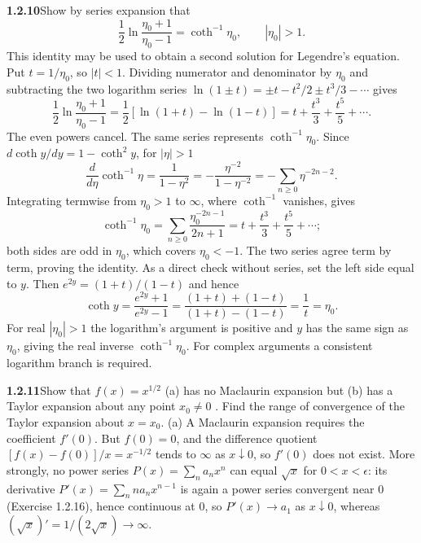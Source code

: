 \par\bigskip
\noindent\textbf{1.2.10}\quad Show by series expansion that
\[
\frac{1}{2}\ln\frac{\eta_{0}+1}{\eta_{0}-1}=\coth^{-1}\eta_{0},
\qquad |\eta_{0}|>1.
\]
This identity may be used to obtain a second solution for Legendre's equation.
\solution
Put $t=1/\eta_0$, so $|t|<1$. Dividing numerator and denominator by
$\eta_0$ and subtracting the two logarithm series
$\ln(1\pm t)=\pm t-t^2/2\pm t^3/3-\cdots$ gives
\[
 \frac12\ln\frac{\eta_0+1}{\eta_0-1}
 =\frac12[\ln(1+t)-\ln(1-t)]
 =t+\frac{t^3}{3}+\frac{t^5}{5}+\cdots.
\]
The even powers cancel. The same series represents $\coth^{-1}\eta_0$.
Since $d\coth y/dy=1-\coth^2y$, for $|\eta|>1$
\[
 \frac{d}{d\eta}\coth^{-1}\eta=\frac1{1-\eta^2}
 =-\frac{\eta^{-2}}{1-\eta^{-2}}=-\sum_{n\ge0}\eta^{-2n-2}.
\]
Integrating termwise from $\eta_0>1$ to $\infty$, where $\coth^{-1}$
vanishes, gives
\[
 \coth^{-1}\eta_0=\sum_{n\ge0}\frac{\eta_0^{-2n-1}}{2n+1}
 =t+\frac{t^3}3+\frac{t^5}5+\cdots;
\]
both sides are odd in $\eta_0$, which covers $\eta_0<-1$. The two series
agree term by term, proving the identity.
As a direct check without series, set the left side equal to $y$.
Then $e^{2y}=(1+t)/(1-t)$ and hence
\[
 \coth y=\frac{e^{2y}+1}{e^{2y}-1}
 =\frac{(1+t)+(1-t)}{(1+t)-(1-t)}=\frac1t=\eta_0.
\]
For real $|\eta_0|>1$ the logarithm's argument is positive and $y$
has the same sign as $\eta_0$, giving the real inverse $\coth^{-1}\eta_0$.
For complex arguments a consistent logarithm branch is required.


\par\bigskip
\noindent\textbf{1.2.11}\quad Show that $f(x)=x^{1/2}$ (a) has no Maclaurin
expansion but (b) has a Taylor expansion about any point $x_0\ne0$ . Find
the range of convergence of the Taylor expansion about $x=x_{0}$.
\solution
(a) A Maclaurin expansion requires the coefficient $f'(0)$. But
$f(0)=0$, and the difference quotient $[f(x)-f(0)]/x=x^{-1/2}$ tends to
$\infty$ as $x\downarrow0$, so $f'(0)$ does not exist. More strongly, no
power series $P(x)=\sum_na_nx^n$ can equal $\sqrt x$ for $0<x<\epsilon$:
its derivative $P'(x)=\sum_nna_nx^{n-1}$ is again a power series
convergent near $0$ (Exercise 1.2.16), hence continuous at $0$, so
$P'(x)\to a_1$ as $x\downarrow0$, whereas
$(\sqrt x)'=1/(2\sqrt x)\to\infty$.


